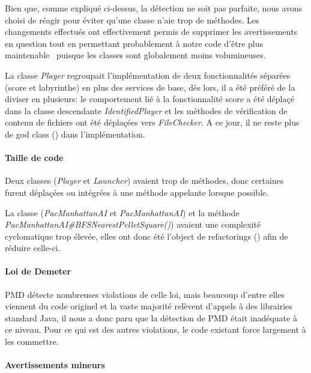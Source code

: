 \documentclass[12pt, openany]{report}
\begin{document}
Bien que, comme expliqué ci-dessus, la détection ne soit pas parfaite, nous avons choisi de réagir pour éviter qu'une classe n'aie trop de méthodes. Les changements effectués ont effectivement permis de supprimer les avertissements en question tout en permettant probablement à notre code d'être plus \og maintenable \fg \, puisque les classes sont globalement moins volumineuses.

La classe \mbox{\textit{Player}} regroupait l'implémentation de deux fonctionnalités séparées (score et labyrinthe) en plus des services de base, dès lors, il a été préféré de la diviser en plusieurs: le comportement lié à la fonctionnalité \og score \fg a été déplaçé dans la classe descendante \mbox{\textit{IdentifiedPlayer}} et les méthodes de vérification de contenu de fichiers ont été déplaçées vers \mbox{\textit{FileChecker}}.
A ce jour, il ne reste plus de \og god class \fg() dans l'implémentation.


\paragraph{Taille de code}

Deux classes (\mbox{\textit{Player}} et \mbox{\textit{Launcher}}) avaient trop de méthodes, donc certaines furent déplaçées ou intégrées à une méthode appelante lorsque possible.

La classe (\mbox{\textit{PacManhattanAI}} et \mbox{\textit{PacManhattanAI}}) et la méthode \mbox{\textit{PacManhattanAI\#BFSNearestPelletSquare()}}) avaient une complexité cyclomatique trop élevée, elles ont donc été l'object de \og refactorings \fg() afin de réduire celle-ci.

\paragraph{Loi de Demeter}

PMD détecte nombreuses violations de celle loi, mais beaucoup d'entre elles viennent du code originel et la vaste majorité relèvent d'appels à des librairies standard Java, il nous a donc paru que la détection de PMD était inadéquate à ce niveau.
Pour ce qui est des autres violations, le code existant force largement à les commettre.

\paragraph{Avertissements mineurs}
\end{document}
